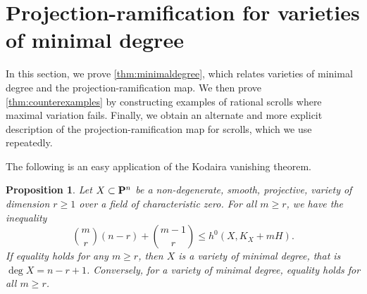 \documentclass[11pt,reqno]{amsart}
\theoremstyle{plain}
\newtheorem{proposition}[theorem]{Proposition}
\theoremstyle{definition}
\theoremstyle{remark}
\numberwithin{equation}{section}
\numberwithin{equation}{section}
\begin{document}
\section{Projection-ramification for varieties of minimal degree}\label{sec:minimaldegree}
In this section, we prove \autoref{thm:minimaldegree}, which relates varieties of minimal degree and the projection-ramification map.
We then prove \autoref{thm:counterexamples} by constructing examples of rational scrolls where maximal variation fails.
Finally, we obtain an alternate and more explicit description of the projection-ramification map for scrolls, which we use repeatedly.

The following is an easy application of the Kodaira vanishing theorem.
\begin{proposition}\label{lem:kymh}
  Let $X \subset \P^n$ be a non-degenerate, smooth, projective, variety of dimension $r \geq 1$ over a field of characteristic zero.
  For all $m \geq r$, we have the inequality
  \begin{equation}\label{eqn:KYmH}
    {m \choose r}(n-r) + {{m-1} \choose {r}}\leq h^0(X, K_X + mH).
  \end{equation}
  If equality holds for any $m \geq r$, then $X$ is a variety of minimal degree, that is $\deg X = n-r+1$.
  Conversely, for a variety of minimal degree, equality holds for all $m \geq r$.
\end{proposition}
\end{document}
